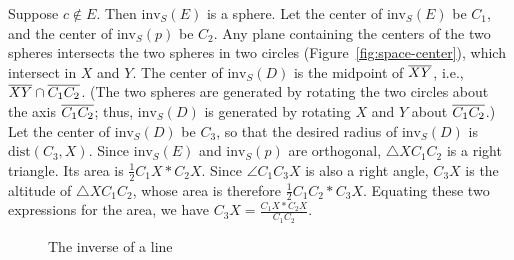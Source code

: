 \begin{enumerate}
Suppose $c \not \in E$.
Then $\mbox{inv}_{S}(E)$ is a sphere.
Let the center of $\mbox{inv}_{S}(E)$ be $C_{1}$, and
the center of $\mbox{inv}_{S}(p)$ be $C_{2}$.
Any plane containing the centers of the two spheres 
intersects the two spheres in two circles (Figure~\ref{fig:space-center}),
which intersect in $X$ and $Y$.
The center of $\mbox{inv}_{S}(D)$ is the midpoint of $\mbox{$\overline{XY}$}$,
i.e., $\mbox{$\overline{XY}$} \cap \mbox{$\overline{C_{1}C_{2}}$}$.
(The two spheres are generated by rotating the two circles about 
the axis $\mbox{$\overline{C_{1}C_{2}}$}$; 
thus, $\mbox{inv}_{S}(D)$ is generated by rotating $X$ and $Y$ about
$\mbox{$\overline{C_{1}C_{2}}$}$.)
Let the center of $\mbox{inv}_{S}(D)$ be $C_{3}$,
so that
the desired radius of $\mbox{inv}_{S}(D)$ is $\mbox{dist}(C_{3},X)$.
Since $\mbox{inv}_{S}(E)$ and $\mbox{inv}_{S}(p)$ are orthogonal,
$\triangle X C_1 C_2$ is a right triangle.
Its area is $\frac{1}{2} C_1 X * C_2 X$.
Since $\angle C_1 C_3 X$ is also a right angle, $C_3 X$ is the altitude
of $\triangle X C_1 C_2$, whose area is therefore $\frac{1}{2} C_1 C_2 *C_3 X$.
Equating these two expressions for the area, we have
$C_3 X = \frac{C_1 X * C_2 X}{C_1 C_2}$.
%
%
\end{enumerate}
\QED


\begin{figure}
\vspace{2.5in}
\caption{The inverse of a line}
\label{fig:plrad}
\end{figure}

